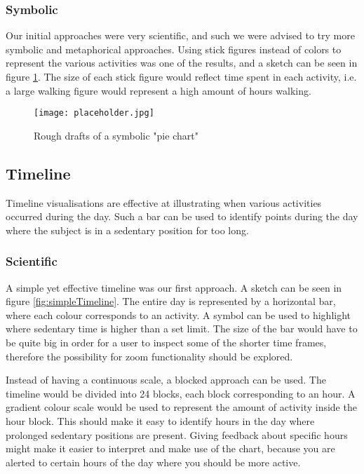 \subsubsection{Symbolic}
Our initial approaches were very scientific, and such we were advised to try more symbolic and metaphorical approaches. Using stick figures instead of colors to represent the various activities was one of the results, and a sketch can be seen in figure \ref{fig:symbolicPie}. The size of each stick figure would reflect time spent in each activity, i.e. a large walking figure would represent a high amount of hours walking. %
\begin{figure}[h!]
	\centering
		\texttt{[image: placeholder.jpg]}
		\caption{\footnotesize Rough drafts of a symbolic "pie chart"}
		\label{fig:symbolicPie}
\end{figure}

\subsection{Timeline}
Timeline visualisations are effective at illustrating when various activities occurred during the day. Such a bar can be used to identify points during the day where the subject is in a sedentary position for too long.

\subsubsection{Scientific}
A simple yet effective timeline was our first approach. A sketch can be seen in figure \ref{fig:simpleTimeline}. The entire day is represented by a horizontal bar, where each colour corresponds to an activity. A symbol can be used to highlight where sedentary time is higher than a set limit. The size of the bar would have to be quite big in order for a user to inspect some of the shorter time frames, therefore the possibility for zoom functionality should be explored.

Instead of having a continuous scale, a blocked approach can be used. The timeline would be divided into 24 blocks, each block corresponding to an hour. A gradient colour scale would be used to represent the amount of activity inside the hour block. This should make it easy to identify hours in the day where prolonged sedentary positions are present. Giving feedback about specific hours might make it easier to interpret and make use of the chart, because you are alerted to certain hours of the day where you should be more active.

